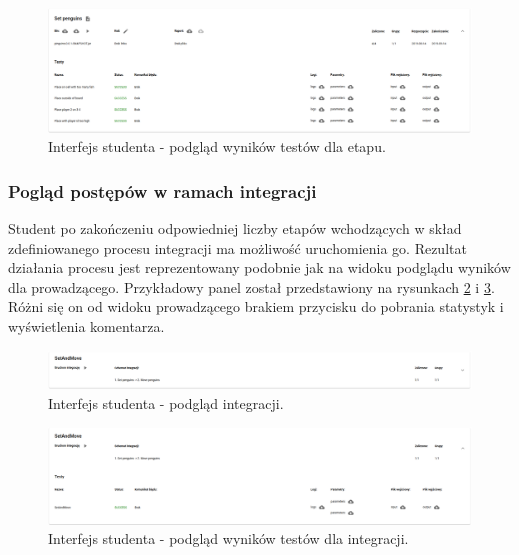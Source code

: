 \begin{figure}[h]
    \centering
    \includegraphics[width = 15cm]{chapter04/student_stage_tests.png}
    \caption{Interfejs studenta - podgląd wyników testów dla etapu.}
    \label{fig:student_stage_tests}
\end{figure}

\subsubsection{Pogląd postępów w ramach integracji}

Student po zakończeniu odpowiedniej liczby etapów wchodzących w skład zdefiniowanego procesu integracji ma możliwość uruchomienia go.
Rezultat działania procesu jest reprezentowany podobnie jak na widoku podglądu wyników dla prowadzącego.
Przykładowy panel został przedstawiony na rysunkach \ref{fig:student_integration} i \ref{fig:student_integration_tests}.
Różni się on od widoku prowadzącego brakiem przycisku do pobrania statystyk i wyświetlenia komentarza.

\begin{figure}[H]
    \centering
    \includegraphics[width = 15cm]{chapter04/student_integration.png}
    \caption{Interfejs studenta - podgląd integracji.}
    \label{fig:student_integration}
\end{figure}

\begin{figure}[H]
    \centering
    \includegraphics[width = 15cm]{chapter04/student_integration_tests.png}
    \caption{Interfejs studenta - podgląd wyników testów dla integracji.}
    \label{fig:student_integration_tests}
\end{figure}

\vfill